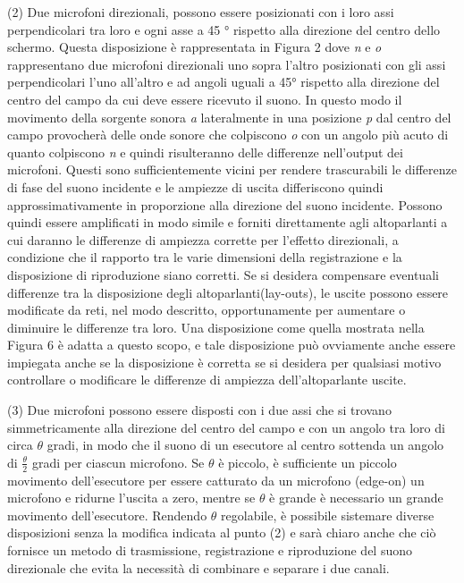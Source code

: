 \documentclass[11pt]{article}
\begin{document}
\begin{multicols*}{2}
(2) Due microfoni direzionali, possono essere posizionati con i loro assi perpendicolari tra loro e ogni asse a 45 ° rispetto alla direzione del centro dello schermo. Questa disposizione è rappresentata in Figura 2 dove \textit{n} e \textit{o} rappresentano due microfoni direzionali uno sopra l'altro posizionati con gli assi perpendicolari l'uno all'altro e ad angoli uguali a 45° rispetto alla direzione del centro del campo da cui deve essere ricevuto il suono. In questo modo il movimento della sorgente sonora \textit{a} lateralmente in una posizione \textit{p} dal centro del campo provocherà delle onde sonore che colpiscono \textit{o} con un angolo più acuto di quanto colpiscono \textit{n} e quindi risulteranno delle differenze nell’output dei microfoni. Questi sono sufficientemente vicini per rendere trascurabili le differenze di fase del suono incidente e le ampiezze di uscita differiscono quindi approssimativamente in proporzione alla direzione del suono incidente. Possono quindi essere amplificati in modo simile e forniti direttamente agli altoparlanti a cui daranno le differenze di ampiezza corrette per l'effetto direzionali, a condizione che il rapporto tra le varie dimensioni della registrazione e la disposizione di riproduzione siano corretti. Se si desidera compensare eventuali differenze tra la disposizione degli altoparlanti(lay-outs), le uscite possono essere modificate da reti, nel modo descritto, opportunamente per aumentare o diminuire le differenze tra loro. Una disposizione come quella mostrata nella Figura 6 è adatta a questo scopo, e tale disposizione può ovviamente anche essere impiegata anche se la disposizione è corretta se si desidera per qualsiasi motivo controllare o modificare le differenze di ampiezza dell'altoparlante uscite.


 (3) Due microfoni possono essere disposti con i due assi che si trovano simmetricamente alla direzione del centro del campo e con un angolo tra loro di circa $\theta$ gradi, in modo che il suono di un esecutore al centro sottenda un angolo di $\frac{\theta}{2}$ gradi per ciascun microfono. Se $\theta$ è piccolo, è sufficiente un piccolo movimento dell’esecutore per essere catturato da un microfono (edge-on) un microfono e ridurne l'uscita a zero, mentre se $\theta$ è grande è necessario un grande movimento dell'esecutore. Rendendo $\theta$ regolabile, è possibile sistemare diverse disposizioni senza la modifica indicata al punto (2) e sarà chiaro anche che ciò fornisce un metodo di trasmissione, registrazione e riproduzione del suono direzionale che evita la necessità di combinare e separare i due canali.
 

\end{multicols*}
\end{document}

